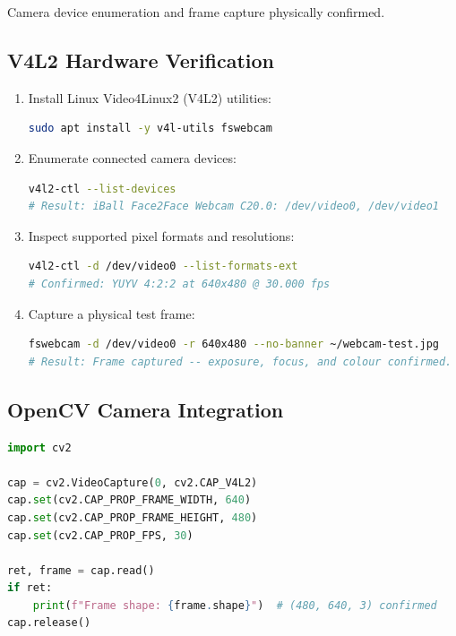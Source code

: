 \documentclass[12pt,a4paper]{article}
\begin{document}
\begin{verifiedbox}
Camera device enumeration and frame capture physically confirmed.
\end{verifiedbox}

\subsection{V4L2 Hardware Verification}

\begin{enumerate}[label=\textbf{\arabic*.}]
  \item Install Linux Video4Linux2 (V4L2) utilities:
  \begin{lstlisting}[language=bash]
sudo apt install -y v4l-utils fswebcam
  \end{lstlisting}

  \item Enumerate connected camera devices:
  \begin{lstlisting}[language=bash]
v4l2-ctl --list-devices
# Result: iBall Face2Face Webcam C20.0: /dev/video0, /dev/video1
  \end{lstlisting}

  \item Inspect supported pixel formats and resolutions:
  \begin{lstlisting}[language=bash]
v4l2-ctl -d /dev/video0 --list-formats-ext
# Confirmed: YUYV 4:2:2 at 640x480 @ 30.000 fps
  \end{lstlisting}

  \item Capture a physical test frame:
  \begin{lstlisting}[language=bash]
fswebcam -d /dev/video0 -r 640x480 --no-banner ~/webcam-test.jpg
# Result: Frame captured -- exposure, focus, and colour confirmed.
  \end{lstlisting}
\end{enumerate}

\subsection{OpenCV Camera Integration}

\begin{lstlisting}[language=python, caption={OpenCV V4L2 camera integration (src/webcam\_capture.py)}]
import cv2

cap = cv2.VideoCapture(0, cv2.CAP_V4L2)
cap.set(cv2.CAP_PROP_FRAME_WIDTH, 640)
cap.set(cv2.CAP_PROP_FRAME_HEIGHT, 480)
cap.set(cv2.CAP_PROP_FPS, 30)

ret, frame = cap.read()
if ret:
    print(f"Frame shape: {frame.shape}")  # (480, 640, 3) confirmed
cap.release()
\end{lstlisting}
\end{document}
